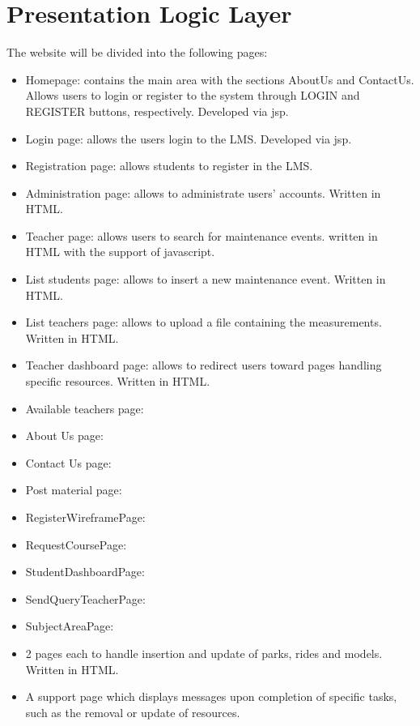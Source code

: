 \section{Presentation Logic Layer}
\graphicspath{ {./HW_1/images/} }

The website will be divided into the following pages:
\begin{itemize}
    \item Homepage: contains the main area with the sections AboutUs and ContactUs. Allows users to login or register to the system through LOGIN and REGISTER buttons, respectively. Developed via jsp.
    \item Login page: allows the users login to the LMS. Developed via jsp.
    \item Registration page: allows students to register in the LMS.
    \item Administration page: allows to administrate users’ accounts. Written in HTML.
    \item Teacher page: allows users to search for maintenance events. written in HTML with the
support of javascript.
    \item List students page: allows to insert a new maintenance event. Written in HTML.
    \item List teachers page: allows to upload a file containing the measurements. Written in HTML.
    \item Teacher dashboard page: allows to redirect users toward pages handling specific resources. Written in HTML.
    \item Available teachers page:
    \item About Us page:
    \item Contact Us page:
    \item Post material page:
    \item RegisterWireframePage:
    \item RequestCoursePage:
    \item StudentDashboardPage:
    \item SendQueryTeacherPage:
    \item SubjectAreaPage:
    \item 2 pages each to handle insertion and update of parks, rides and models. Written in HTML.
    
    \item A support page which displays messages upon completion of specific tasks, such as the removal or update
of resources.
\end{itemize}

